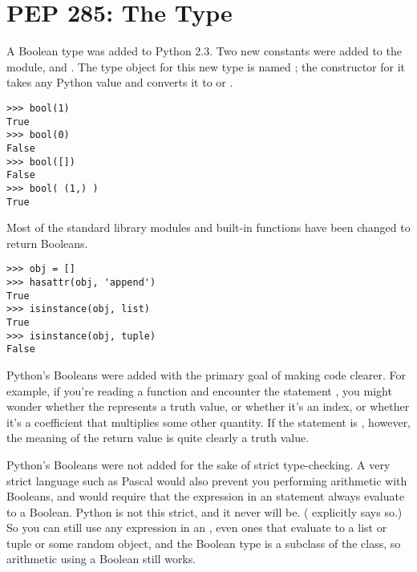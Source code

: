 \documentclass{howto}
\begin{document}
\begin{seealso}


\end{seealso}


\section{PEP 285: The  Type\label{section-bool}}

A Boolean type was added to Python 2.3.  Two new constants were added
to the  module,  and
.  The type object for this new type is named
; the constructor for it takes any Python value and
converts it to  or .

\begin{verbatim}
>>> bool(1)
True
>>> bool(0)
False
>>> bool([])
False
>>> bool( (1,) )
True
\end{verbatim}

Most of the standard library modules and built-in functions have been
changed to return Booleans.

\begin{verbatim}
>>> obj = []
>>> hasattr(obj, 'append')
True
>>> isinstance(obj, list)
True
>>> isinstance(obj, tuple)
False
\end{verbatim}

Python's Booleans were added with the primary goal of making code
clearer.  For example, if you're reading a function and encounter the
statement , you might wonder whether the 
represents a truth value, or whether it's an index, or whether it's a
coefficient that multiplies some other quantity.  If the statement is
, however, the meaning of the return value is quite
clearly a truth value.

Python's Booleans were not added for the sake of strict type-checking.
A very strict language such as Pascal would also prevent you
performing arithmetic with Booleans, and would require that the
expression in an  statement always evaluate to a Boolean.
Python is not this strict, and it never will be.  (
explicitly says so.)  So you can still use any expression in an
, even ones that evaluate to a list or tuple or some
random object, and the Boolean type is a subclass of the
 class, so arithmetic using a Boolean still works.
\end{document}
